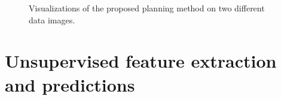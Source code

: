 \begin{figure}[h]
    \hfill
    \caption{Visualizations of the proposed planning method on two different data images.}
    \label{fig:res_unpairqual}
\end{figure}





\section{Unsupervised feature extraction and predictions}


